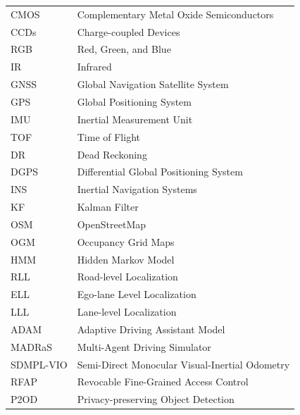 \documentclass[a4paper,12pt]{article}
\begin{document}
\begin{center}
\begin{longtable}{|l|l|}
CMOS & Complementary Metal Oxide Semiconductors\\

CCDs & Charge-coupled Devices\\

RGB & Red, Green, and Blue \\

IR & Infrared\\

GNSS & Global Navigation Satellite System\\

GPS & Global Positioning System\\

IMU & Inertial Measurement Unit \\

TOF & Time of Flight \\

DR & Dead Reckoning \\

DGPS & Differential Global Positioning System \\

INS & Inertial Navigation Systems \\

KF & Kalman Filter \\

OSM & OpenStreetMap \\

OGM & Occupancy Grid Maps \\

HMM & Hidden Markov Model \\

RLL & Road-level Localization\\

ELL & Ego-lane Level Localization \\

LLL & Lane-level Localization \\

ADAM & Adaptive Driving Assistant Model\\

MADRaS & Multi-Agent Driving Simulator \\

SDMPL-VIO & Semi-Direct Monocular Visual-Inertial Odometry \\

RFAP & Revocable Fine-Grained Access Control \\

P2OD & Privacy-preserving Object Detection \\


\end{longtable}
\end{center}
\end{document}
